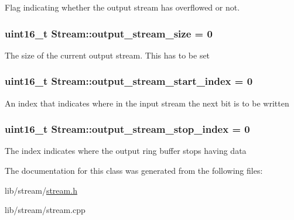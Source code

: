 Flag indicating whether the output stream has overflowed or not. \hypertarget{class_stream_a3a171d646ab70eeb9c034aecb3a72003}{
\subsubsection[{output\-\_\-stream\-\_\-size}]{\setlength{\rightskip}{0pt plus 5cm}uint16\-\_\-t Stream\-::output\-\_\-stream\-\_\-size = 0\hspace{0.3cm}{\ttfamily [protected]}}}\label{class_stream_a3a171d646ab70eeb9c034aecb3a72003}
The size of the current output stream. This has to be set \hypertarget{class_stream_a7406f5db92c18f0a6d7dcc924a6122cc}{
\subsubsection[{output\-\_\-stream\-\_\-start\-\_\-index}]{\setlength{\rightskip}{0pt plus 5cm}uint16\-\_\-t Stream\-::output\-\_\-stream\-\_\-start\-\_\-index = 0\hspace{0.3cm}{\ttfamily [protected]}}}\label{class_stream_a7406f5db92c18f0a6d7dcc924a6122cc}
An index that indicates where in the input stream the next bit is to be written \hypertarget{class_stream_ac3b2282b5977151124aa77c2d4e411ec}{
\subsubsection[{output\-\_\-stream\-\_\-stop\-\_\-index}]{\setlength{\rightskip}{0pt plus 5cm}uint16\-\_\-t Stream\-::output\-\_\-stream\-\_\-stop\-\_\-index = 0\hspace{0.3cm}{\ttfamily [protected]}}}\label{class_stream_ac3b2282b5977151124aa77c2d4e411ec}
The index indicates where the output ring buffer stops having data 

The documentation for this class was generated from the following files\-:\begin{DoxyCompactItemize}
\item 
lib/stream/\hyperlink{stream_8h}{stream.\-h}\item 
lib/stream/stream.\-cpp\end{DoxyCompactItemize}
